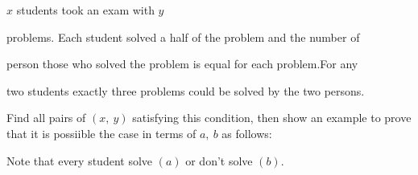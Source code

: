 $ x$ students took an exam with $ y$

 problems. Each student solved a half of the problem and the number of 

person those who solved the problem is equal for each problem.For any 

two students exactly three problems could be solved by the two persons. 

Find all pairs of $ (x,\ y)$  satisfying this condition, then show an example to prove that it is possiible the case in terms of $ a,\ b$ as follows:

Note that every student solve $ (a)$ or don't solve $ (b)$.